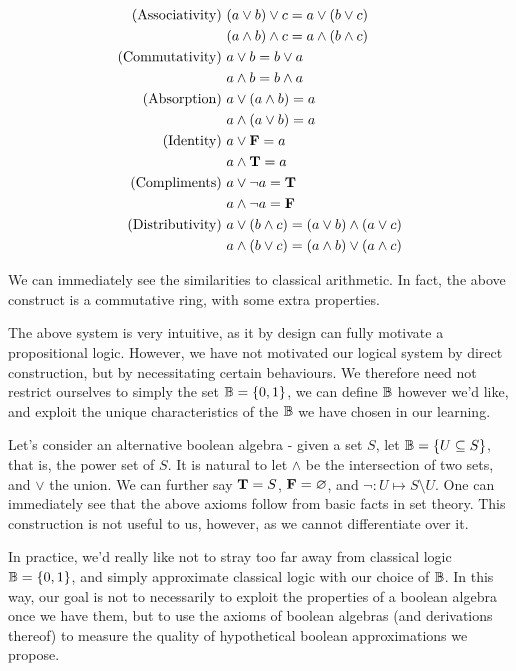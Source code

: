 \documentclass[conference]{report}
\begin{document}
$$
\begin{aligned}
\text{(Associativity)}
&\ (a \lor b) \lor c = a \lor (b \lor c) \\
&\ (a \land b) \land c = a \land (b \land c) \\
\text{(Commutativity)}
&\ a \lor b = b \lor a \\
&\ a \land b = b \land a \\
\text{(Absorption)}
&\ a \lor (a \land b) = a \\
&\ a \land (a \lor b) = a \\
\text{(Identity)}
&\ a \lor \textbf{F} = a \\
&\ a \land \textbf{T} = a \\
\text{(Compliments)}
&\ a \lor \neg a = \textbf{T} \\
&\ a \land \neg a = \textbf{F} \\
\text{(Distributivity)}
&\ a \lor (b \land c) = (a \lor b) \land (a \lor c) \\
&\ a \land (b \lor c) = (a \land b) \lor (a \land c) \\
\end{aligned}
$$

We can immediately see the similarities to classical arithmetic. In fact, the above construct is a commutative ring, with some extra properties. 

The above system is very intuitive, as it by design can fully motivate a propositional logic. However, we have not motivated our logical system by direct construction, but by necessitating certain behaviours. We therefore need not restrict ourselves to simply the set $\mathbb{B}=\{0,1\}$, we can define $\mathbb{B}$ however we'd like, and exploit the unique characteristics of the $\mathbb{B}$ we have chosen in our learning.

Let's consider an alternative boolean algebra - given a set $S$, let $\mathbb{B} = {\{ U \subseteq S \}}$, that is, the power set of $S$. It is natural to let $\land$ be the intersection of two sets, and $\lor$ the union. We can further say $\textbf{T} = S$, $\textbf{F} = \varnothing$, and $\neg:U \mapsto S \setminus U$. One can immediately see that the above axioms follow from basic facts in set theory. This construction is not useful to us, however, as we cannot differentiate over it.

In practice, we'd really like not to stray too far away from classical logic $\mathbb{B} = \{0,1\}$, and simply approximate classical logic with our choice of $\mathbb{B}$. In this way, our goal is not to necessarily to exploit the properties of a boolean algebra once we have them, but to use the axioms of boolean algebras (and derivations thereof) to measure the quality of hypothetical boolean approximations we propose.
\end{document}
